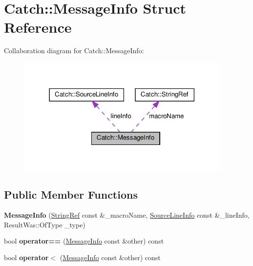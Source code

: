 \hypertarget{structCatch_1_1MessageInfo}{}\section{Catch\+::Message\+Info Struct Reference}
\label{structCatch_1_1MessageInfo}


Collaboration diagram for Catch\+::Message\+Info\+:
\nopagebreak
\begin{figure}[H]
\begin{center}
\leavevmode
\includegraphics[width=302pt]{structCatch_1_1MessageInfo__coll__graph}
\end{center}
\end{figure}
\subsection*{Public Member Functions}
\begin{DoxyCompactItemize}
\item 
\mbox{\label{structCatch_1_1MessageInfo_afac7a84a9e8655428035a3c5418044f0}} 
{\bfseries Message\+Info} (\mbox{\hyperlink{classCatch_1_1StringRef}{String\+Ref}} const \&\+\_\+macro\+Name, \mbox{\hyperlink{structCatch_1_1SourceLineInfo}{Source\+Line\+Info}} const \&\+\_\+line\+Info, Result\+Was\+::\+Of\+Type \+\_\+type)
\item 
\mbox{\label{structCatch_1_1MessageInfo_af4b37f2172ba55395813b4bb6bbbde1a}} 
bool {\bfseries operator==} (\mbox{\hyperlink{structCatch_1_1MessageInfo}{Message\+Info}} const \&other) const
\item 
\mbox{\label{structCatch_1_1MessageInfo_a8254cb8fca2da02a29a9843cdcb79df1}} 
bool {\bfseries operator$<$} (\mbox{\hyperlink{structCatch_1_1MessageInfo}{Message\+Info}} const \&other) const
\end{DoxyCompactItemize}
